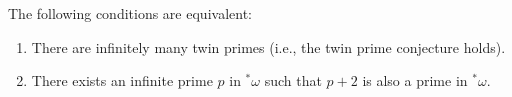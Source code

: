 The following conditions are equivalent:
\begin{enumerate}
\item[(i)] There are infinitely many twin primes (i.e., the twin prime conjecture holds).
\item[(ii)] There exists an infinite prime $p$ in $^*\omega$ such that $p + 2$ is also a prime in $^*\omega$.
\end{enumerate}
